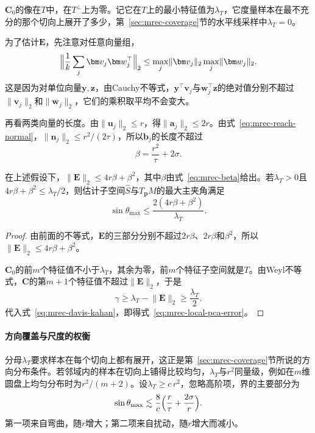 $\bm C_0$的像在$T$中，在$T^\perp$上为零。记它在$T$上的最小特征值为$\lambda_T$，它度量样本在最不充分的那个切向上展开了多少，第~\ref{sec:mrec-coverage}节的水平线采样中$\lambda_T=0$。

为了估计$\bm E$，先注意对任意向量组，
\[
 \Bigl\lVert\frac1k\sum_j\bm v_j\bm w_j^\top\Bigr\rVert_2\leq\max_j\lVert\bm v_j\rVert_2\max_j\lVert\bm w_j\rVert_2 .
\]
这是因为对单位向量$\bm y,\bm z$，由Cauchy不等式，$\bm y^\top\bm v_j$与$\bm w_j^\top\bm z$的绝对值分别不超过$\lVert\bm v_j\rVert_2$和$\lVert\bm w_j\rVert_2$，它们的乘积取平均不会变大。

再看两类向量的长度。由$\lVert\bm u_j\rVert_2\leq r$，得$\lVert\bm a_j\rVert_2\leq2r$。由式~\eqref{eq:mrec-reach-normal}，$\lVert\bm n_j\rVert_2\leq r^2/(2\tau)$，所以$\bm b_j$的长度不超过
\begin{equation}
 \beta=\frac{r^2}\tau+2\sigma .
 \label{eq:mrec-beta}
\end{equation}

\begin{theorem}[局部PCA的方向误差]
\label{thm:mrec-local-pca-error}
在上述假设下，$\lVert\bm E\rVert_2\leq4r\beta+\beta^2$，其中$\beta$由式~\eqref{eq:mrec-beta}给出。若$\lambda_T>0$且$4r\beta+\beta^2\leq\lambda_T/2$，则估计子空间$\widehat S$与$T_{\bm p}M$的最大主夹角满足
\begin{equation}
 \sin\theta_{\max}\leq\frac{2(4r\beta+\beta^2)}{\lambda_T}.
 \label{eq:mrec-local-pca-error}
\end{equation}
\end{theorem}
\begin{proof}
由前面的不等式，$\bm E$的三部分分别不超过$2r\beta$、$2r\beta$和$\beta^2$，所以$\lVert\bm E\rVert_2\leq4r\beta+\beta^2$。

$\bm C_0$的前$m$个特征值不小于$\lambda_T$，其余为零，前$m$个特征子空间就是$T$。由Weyl不等式，$\bm C$的第$m+1$个特征值不超过$\lVert\bm E\rVert_2$，于是
\[
 \gamma\geq\lambda_T-\lVert\bm E\rVert_2\geq\frac{\lambda_T}2 .
\]
代入式~\eqref{eq:mrec-davis-kahan}，即得式~\eqref{eq:mrec-local-pca-error}。
\end{proof}

\paragraph{方向覆盖与尺度的权衡}

分母$\lambda_T$要求样本在每个切向上都有展开，这正是第~\ref{sec:mrec-coverage}节所说的方向分布条件。若邻域内的样本在切向上铺得比较均匀，$\lambda_T$与$r^2$同量级，例如在$m$维圆盘上均匀分布时为$r^2/(m+2)$。设$\lambda_T\geq c\,r^2$，忽略高阶项，界的主要部分为
\begin{equation}
 \sin\theta_{\max}\lesssim\frac8c\Bigl(\frac r\tau+\frac{2\sigma}r\Bigr).
 \label{eq:mrec-pca-tradeoff}
\end{equation}
第一项来自弯曲，随$r$增大；第二项来自扰动，随$r$增大而减小。

